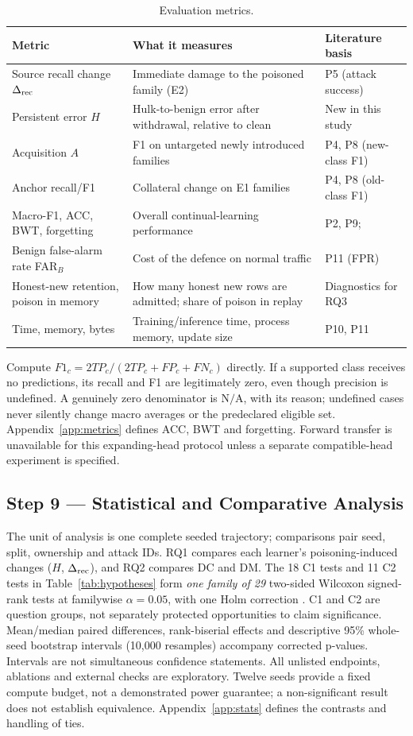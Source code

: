 \documentclass[10pt,a4paper]{article}
\newcommand{\NA}{\mathrm{N/A}}
\begin{document}
\begin{table}[H]
\centering\footnotesize
\caption{Evaluation metrics.}
\label{tab:metrics}
\begin{tabularx}{\linewidth}{L{3.6cm}Y L{3.0cm}}
\toprule
Metric & What it measures & Literature basis\\
\midrule
Source recall change $\Delta_{\rm rec}$ & Immediate damage to the poisoned family (E2) & P5 (attack success)\\
Persistent error $H$ & Hulk-to-benign error after withdrawal, relative to clean & New in this study\\
Acquisition $A$ & F1 on untargeted newly introduced families & P4, P8 (new-class F1)\\
Anchor recall/F1 & Collateral change on E1 families & P4, P8 (old-class F1)\\
Macro-F1, ACC, BWT, forgetting & Overall continual-learning performance & P2, P9; \cite{gem,clmetrics}\\
Benign false-alarm rate FAR$_B$ & Cost of the defence on normal traffic & P11 (FPR)\\
Honest-new retention, poison in memory & How many honest new rows are admitted; share of poison in replay & Diagnostics for RQ3\\
Time, memory, bytes & Training/inference time, process memory, update size & P10, P11\\
\bottomrule
\end{tabularx}
\end{table}
Compute $F1_c=2TP_c/(2TP_c+FP_c+FN_c)$ directly. If a supported class receives no predictions, its recall and F1 are legitimately zero, even though precision is undefined. A genuinely zero denominator is $\NA$, with its reason; undefined cases never silently change macro averages or the predeclared eligible set. Appendix~\ref{app:metrics} defines ACC, BWT and forgetting. Forward transfer is unavailable for this expanding-head protocol unless a separate compatible-head experiment is specified.

\subsection{Step 9 --- Statistical and Comparative Analysis}
The unit of analysis is one complete seeded trajectory; comparisons pair seed, split, ownership and attack IDs. RQ1 compares each learner's poisoning-induced changes ($H$, $\Delta_{\rm rec}$), and RQ2 compares DC and DM. The 18 C1 tests and 11 C2 tests in Table~\ref{tab:hypotheses} form \emph{one family of 29} two-sided Wilcoxon signed-rank tests at familywise $\alpha=0.05$, with one Holm correction \cite{wilcoxon,holm}. C1 and C2 are question groups, not separately protected opportunities to claim significance. Mean/median paired differences, rank-biserial effects and descriptive 95\% whole-seed bootstrap intervals (10,000 resamples) accompany corrected p-values. Intervals are not simultaneous confidence statements. All unlisted endpoints, ablations and external checks are exploratory. Twelve seeds provide a fixed compute budget, not a demonstrated power guarantee; a non-significant result does not establish equivalence. Appendix~\ref{app:stats} defines the contrasts and handling of ties.
\end{document}
